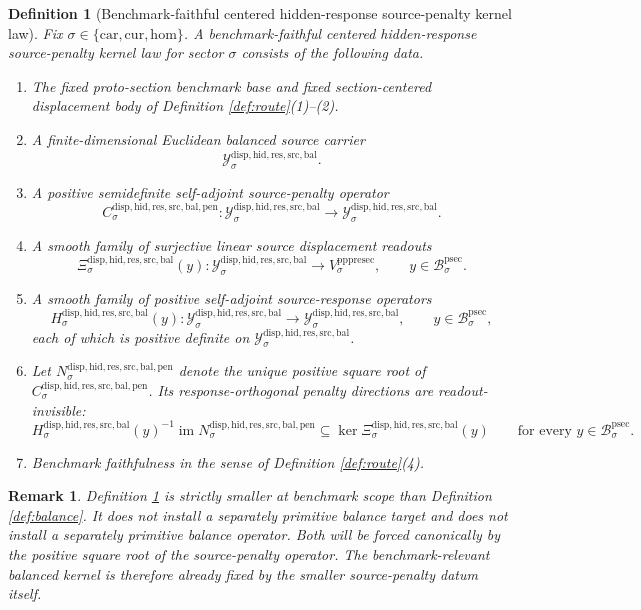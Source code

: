 \documentclass[11pt]{article}
\newcommand{\Car}{\mathrm{car}}
\newcommand{\Cur}{\mathrm{cur}}
\newcommand{\Hom}{\mathrm{hom}}
\newcommand{\ProtoSectionBody}[1]{\mathcal B_{#1}^{\mathrm{psec}}}
\newcommand{\PrePreProtoSectionVertical}[1]{V_{#1}^{\mathrm{pppresec}}}
\newcommand{\BalancedSourceCarrier}[1]{\mathcal Y_{#1}^{\mathrm{disp,hid,res,src,bal}}}
\newcommand{\SourceBalanceReadout}[1]{\Xi_{#1}^{\mathrm{disp,hid,res,src,bal}}}
\newcommand{\SourceBalanceResponse}[1]{H_{#1}^{\mathrm{disp,hid,res,src,bal}}}
\newcommand{\SourcePenaltyOperator}[1]{C_{#1}^{\mathrm{disp,hid,res,src,bal,pen}}}
\newcommand{\SourcePenaltySquareRoot}[1]{N_{#1}^{\mathrm{disp,hid,res,src,bal,pen}}}
\newtheorem{definition}{Definition}
\newtheorem{remark}{Remark}
\begin{document}
\begin{definition}[Benchmark-faithful centered hidden-response source-penalty kernel law]
\label{def:penalty}
Fix \(\sigma\in\{\Car,\Cur,\Hom\}\). A \emph{benchmark-faithful centered hidden-response source-penalty kernel law} for sector \(\sigma\) consists of the following data.
\begin{enumerate}
    \item The fixed proto-section benchmark base and fixed section-centered displacement body of Definition \ref{def:route}(1)--(2).
    \item A finite-dimensional Euclidean balanced source carrier
    \[
    \BalancedSourceCarrier{\sigma}.
    \]
    \item A positive semidefinite self-adjoint source-penalty operator
    \[
    \SourcePenaltyOperator{\sigma}:
    \BalancedSourceCarrier{\sigma}\to\BalancedSourceCarrier{\sigma}.
    \]
    \item A smooth family of surjective linear source displacement readouts
    \[
    \SourceBalanceReadout{\sigma}(y):
    \BalancedSourceCarrier{\sigma}\to\PrePreProtoSectionVertical{\sigma},
    \qquad
    y\in\ProtoSectionBody{\sigma}.
    \]
    \item A smooth family of positive self-adjoint source-response operators
    \[
    \SourceBalanceResponse{\sigma}(y):
    \BalancedSourceCarrier{\sigma}\to\BalancedSourceCarrier{\sigma},
    \qquad
    y\in\ProtoSectionBody{\sigma},
    \]
    each of which is positive definite on \(\BalancedSourceCarrier{\sigma}\).
    \item Let \(\SourcePenaltySquareRoot{\sigma}\) denote the unique positive square root of \(\SourcePenaltyOperator{\sigma}\). Its response-orthogonal penalty directions are readout-invisible:
    \[
    \SourceBalanceResponse{\sigma}(y)^{-1}
    \operatorname{im}\SourcePenaltySquareRoot{\sigma}
    \subseteq
    \ker \SourceBalanceReadout{\sigma}(y)
    \qquad
    \text{for every }
    y\in\ProtoSectionBody{\sigma}.
    \]
    \item Benchmark faithfulness in the sense of Definition \ref{def:route}(4).
\end{enumerate}
\end{definition}

\begin{remark}
Definition \ref{def:penalty} is strictly smaller at benchmark scope than Definition \ref{def:balance}. It does not install a separately primitive balance target and does not install a separately primitive balance operator. Both will be forced canonically by the positive square root of the source-penalty operator. The benchmark-relevant balanced kernel is therefore already fixed by the smaller source-penalty datum itself.
\end{remark}
\end{document}

